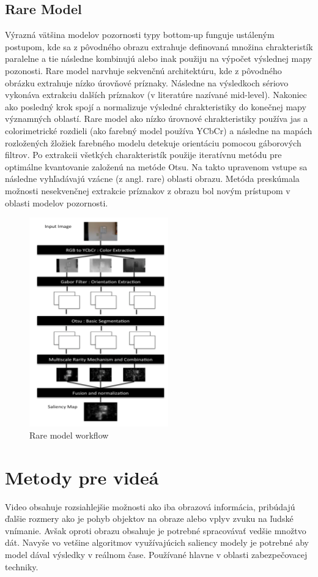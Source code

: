 \subsection{Rare Model}
Výrazná vätšina modelov pozornosti typy bottom-up funguje ustáleným postupom, kde sa z pôvodného obrazu extrahuje definovaná množina chrakteristík paralelne a tie následne kombinujú alebo inak použiju na výpočet výslednej mapy pozonosti. Rare model narvhuje sekvenčnú architektúru, kde z pôvodného obrázku extrahuje nízko úrovňové príznaky. Následne na výsledkoch sériovo vykonáva extrakciu dalších príznakov (v literatúre nazívané mid-level). Nakoniec ako posledný krok spojí a normalizuje výsledné chrakteristiky do konečnej mapy významných oblastí. Rare model ako nízko úrovnové chrakteristiky používa jas a colorimetrické rozdieli (ako farebný model používa YCbCr) a následne na mapách rozložených žložiek farebného modelu detekuje orientáciu pomocou gáborových filtrov\cite{rare-1}. Po extrakcii všetkých charakteristík použije iteratívnu metódu pre optimálne kvantovanie založenú na metóde Otsu\cite{rare-2}. Na takto upravenom vstupe sa následne vyhľadávajú vzácne (z angl. rare) oblasti obrazu. Metóda preskúmala možnosti nesekvenčnej extrakcie príznakov z obrazu bol novým prístupom v oblasti modelov pozornosti.

\begin{figure}[H]
  \centering
  \includegraphics[width=6cm]{pics/rare-1.png}
  \caption{Rare model workflow}\label{wrap-fig:3}
\end{figure}

\section{Metody pre videá}
Video obsahuje rozsiahlejšie možnosti ako iba obrazová informácia, pribúdajú ďalšie rozmery ako je pohyb objektov na obraze alebo vplyv zvuku na ľudské vnímanie. Avšak oproti obrazu obsahuje je potrebné spracovávať vedšie množtvo
dát. Navyše vo vetšine algoritmov využívajúcich saliency modely je potrebné aby model dával výsledky v reálnom čase. Používané hlavne v oblasti zabezpečovacej techniky.
